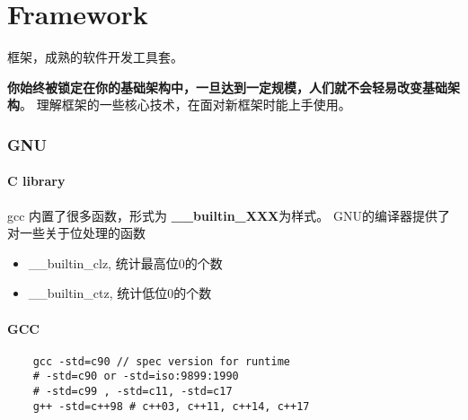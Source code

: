 \clearpage
\part{Framework}
框架，成熟的软件开发工具套。

\textbf{你始终被锁定在你的基础架构中，一旦达到一定规模，人们就不会轻易改变基础架构}。
理解框架的一些核心技术，在面对新框架时能上手使用。

\section{GNU}

\subsection{C library}
gcc 内置了很多函数，形式为 \textbf{ \_\_builtin\_XXX}为样式。
GNU的编译器提供了对一些关于位处理的函数
\begin{itemize}
    \item { \_\_builtin\_clz, 统计最高位0的个数 }
    \item { \_\_builtin\_ctz, 统计低位0的个数}
\end{itemize}

\subsection{GCC}

\begin{lstlisting}
    gcc -std=c90 // spec version for runtime
    # -std=c90 or -std=iso:9899:1990
    # -std=c99 , -std=c11, -std=c17
    g++ -std=c++98 # c++03, c++11, c++14, c++17
\end{lstlisting}

